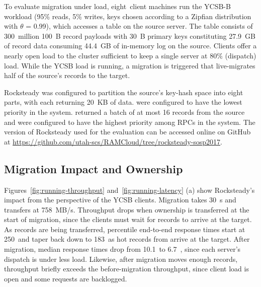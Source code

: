 
To evaluate migration under load, eight~client machines run the YCSB-B~\cite{ycsb}
workload (95\% reads, 5\% writes, keys chosen according to a Zipfian
distribution with $\theta$ = 0.99), which accesses a table on the source
server. The table consists of 300~million 100~B record payloads with 30~B
primary keys constituting 27.9~GB of record data consuming 44.4~GB of in-memory
log on the source. Clients offer a nearly open load to the cluster sufficient to keep
a single server at 80\% (dispatch) load.  While the YCSB load is running, a
migration is triggered that live-migrates half of the source's records
to the target.

Rocksteady was configured to partition the source's key-hash space into
eight parts, with each \pull returning 20~KB of data. \pulls were configured
to have the lowest priority in the system. \priopulls returned a batch
of at most 16 records from the
source and were configured
to have the highest priority among RPCs in the system. The version of Rocksteady
used for the evaluation can be accessed online on GitHub at\linebreak{}
{\url{https://github.com/utah-scs/RAMCloud/tree/rocksteady-sosp2017}}.

\subsection{Migration Impact and Ownership}
\label{sec:e2e}
Figures~\ref{fig:running-throughput} and~\ref{fig:running-latency} (a) show
Rocksteady's impact from the perspective of the YCSB clients. Migration
takes 30~s and transfers at 758~MB/s. Throughput drops when ownership is
transferred at the start of migration, since the clients must wait for records
to arrive at the target. As records are being transferred, \nnnth percentile
end-to-end response times start at 250~\us and taper back down to 183~\us as
hot records from \priopulls arrive at the target. After migration, median
response times drop from 10.1~\us to 6.7~\us, since each server's dispatch is under
less load. Likewise, after migration moves enough records, throughput briefly
exceeds the before-migration throughput, since client load is open and some
requests are backlogged.

